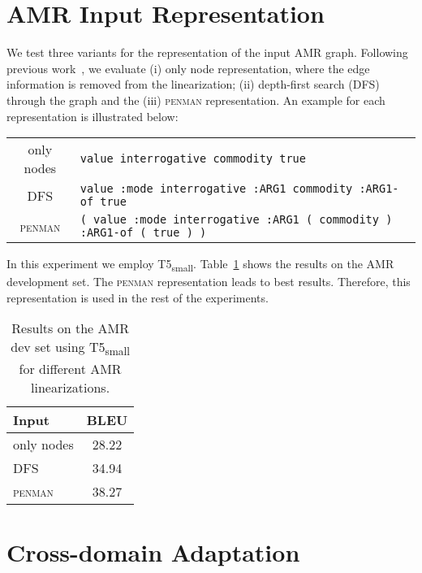 \documentclass[11pt]{article}
\begin{document}
\section{AMR Input Representation}
\label{sec:amrinput}
We test three variants for the representation of the input AMR graph. Following previous work~\cite{konsas_17, mager2020gpttoo}, we evaluate (i) only node representation, where the edge information is removed from the linearization; (ii) depth-first search (DFS) through the graph and the (iii) \textsc{penman} representation. An example for each representation is illustrated below: 
\begin{table}[h]
\begin{tabular}{c p{5.5cm}}
\vspace{3mm}
\small only nodes   & \small \texttt{value interrogative commodity true}\\
\small DFS     & \small \texttt{value :mode interrogative :ARG1 commodity :ARG1-of true} \\
\small \textsc{penman}     & \small \texttt{( value :mode interrogative :ARG1 ( commodity ) :ARG1-of ( true ) )}
\end{tabular}
\end{table}

In this experiment we employ T5\textsubscript{small}. Table~\ref{tab:amrinputs} shows the results on the AMR development set. The \textsc{penman} representation leads to best results. Therefore, this representation is used in the rest of the experiments.

\begin{table}[h]
\centering
{\renewcommand{\arraystretch}{0.8}

\begin{tabular}{lc}  
\toprule
 \textbf{Input} & \textbf{BLEU}  \\
 \midrule
 only nodes & 28.22 \\
 DFS & 34.94 \\
 \textsc{penman} & 38.27 \\
\bottomrule
\end{tabular}}
\caption{Results on the AMR dev set using T5\textsubscript{small} for different AMR linearizations.}
\label{tab:amrinputs}
\end{table}
\vspace{-4mm}

\section{Cross-domain Adaptation}
\label{sec:crossdomain}
\end{document}
